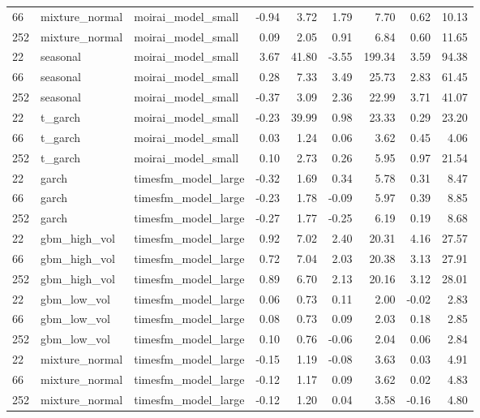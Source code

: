 {\begin{tabular}{lllrrrrrr}
66 & mixture\_normal & moirai\_model\_small & -0.94 & 3.72 & 1.79 & 7.70 & 0.62 & 10.13 \\
252 & mixture\_normal & moirai\_model\_small & 0.09 & 2.05 & 0.91 & 6.84 & 0.60 & 11.65 \\
\midrule
22 & seasonal & moirai\_model\_small & 3.67 & 41.80 & -3.55 & 199.34 & 3.59 & 94.38 \\
66 & seasonal & moirai\_model\_small & 0.28 & 7.33 & 3.49 & 25.73 & 2.83 & 61.45 \\
252 & seasonal & moirai\_model\_small & -0.37 & 3.09 & 2.36 & 22.99 & 3.71 & 41.07 \\
\midrule
22 & t\_garch & moirai\_model\_small & -0.23 & 39.99 & 0.98 & 23.33 & 0.29 & 23.20 \\
66 & t\_garch & moirai\_model\_small & 0.03 & 1.24 & 0.06 & 3.62 & 0.45 & 4.06 \\
252 & t\_garch & moirai\_model\_small & 0.10 & 2.73 & 0.26 & 5.95 & 0.97 & 21.54 \\
\midrule
22 & garch & timesfm\_model\_large & -0.32 & 1.69 & 0.34 & 5.78 & 0.31 & 8.47 \\
66 & garch & timesfm\_model\_large & -0.23 & 1.78 & -0.09 & 5.97 & 0.39 & 8.85 \\
252 & garch & timesfm\_model\_large & -0.27 & 1.77 & -0.25 & 6.19 & 0.19 & 8.68 \\
\midrule
22 & gbm\_high\_vol & timesfm\_model\_large & 0.92 & 7.02 & 2.40 & 20.31 & 4.16 & 27.57 \\
66 & gbm\_high\_vol & timesfm\_model\_large & 0.72 & 7.04 & 2.03 & 20.38 & 3.13 & 27.91 \\
252 & gbm\_high\_vol & timesfm\_model\_large & 0.89 & 6.70 & 2.13 & 20.16 & 3.12 & 28.01 \\
\midrule
22 & gbm\_low\_vol & timesfm\_model\_large & 0.06 & 0.73 & 0.11 & 2.00 & -0.02 & 2.83 \\
66 & gbm\_low\_vol & timesfm\_model\_large & 0.08 & 0.73 & 0.09 & 2.03 & 0.18 & 2.85 \\
252 & gbm\_low\_vol & timesfm\_model\_large & 0.10 & 0.76 & -0.06 & 2.04 & 0.06 & 2.84 \\
\midrule
22 & mixture\_normal & timesfm\_model\_large & -0.15 & 1.19 & -0.08 & 3.63 & 0.03 & 4.91 \\
66 & mixture\_normal & timesfm\_model\_large & -0.12 & 1.17 & 0.09 & 3.62 & 0.02 & 4.83 \\
252 & mixture\_normal & timesfm\_model\_large & -0.12 & 1.20 & 0.04 & 3.58 & -0.16 & 4.80 \\

\end{tabular}}
